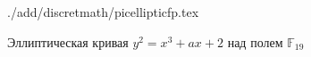 \begin{figure}
\centering
 {./add/discretmath/picellipticfp.tex}
\caption{Эллиптическая кривая $y^2 = x^3 + a x + 2$ над полем
  $\mathbb{F}_{19}$}
\label{fig:add:ellipticFp}
\end{figure}
